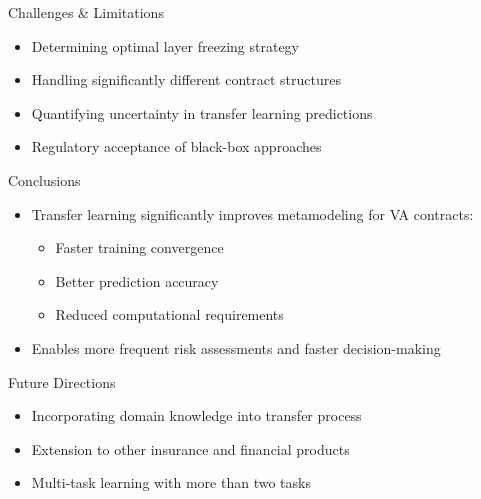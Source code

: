     \begin{frame}{Challenges \& Limitations}
    \begin{itemize}
        \item Determining optimal layer freezing strategy
        \item Handling significantly different contract structures
        \item Quantifying uncertainty in transfer learning predictions
        \item Regulatory acceptance of black-box approaches
    \end{itemize}
    \end{frame}
    
    \begin{frame}{Conclusions}
    \begin{itemize}
        \item Transfer learning significantly improves metamodeling for VA contracts:
        \begin{itemize}
            \item Faster training convergence
            \item Better prediction accuracy
            \item Reduced computational requirements
        \end{itemize}
        \item Enables more frequent risk assessments and faster decision-making
    \end{itemize}
    \end{frame}
    
    \begin{frame}{Future Directions}
    \begin{itemize}
        \item Incorporating domain knowledge into transfer process
        \item Extension to other insurance and financial products
        \item Multi-task learning with more than two tasks
    \end{itemize}
    \end{frame}
